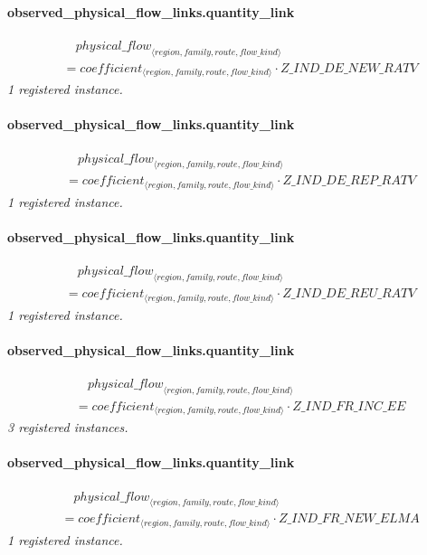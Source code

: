 \documentclass[11pt]{article}
\begin{document}
\paragraph{observed\_physical\_flow\_links.quantity\_link}
\begin{align*}
&\quad {physical\_flow}_{\langle region, family, route, flow\_kind\rangle}\\
&= coefficient_{\langle region, family, route, flow\_kind\rangle} \cdot Z\_IND\_DE\_NEW\_RATV
\end{align*}
\noindent\emph{1 registered instance.}\par
\paragraph{observed\_physical\_flow\_links.quantity\_link}
\begin{align*}
&\quad {physical\_flow}_{\langle region, family, route, flow\_kind\rangle}\\
&= coefficient_{\langle region, family, route, flow\_kind\rangle} \cdot Z\_IND\_DE\_REP\_RATV
\end{align*}
\noindent\emph{1 registered instance.}\par
\paragraph{observed\_physical\_flow\_links.quantity\_link}
\begin{align*}
&\quad {physical\_flow}_{\langle region, family, route, flow\_kind\rangle}\\
&= coefficient_{\langle region, family, route, flow\_kind\rangle} \cdot Z\_IND\_DE\_REU\_RATV
\end{align*}
\noindent\emph{1 registered instance.}\par
\paragraph{observed\_physical\_flow\_links.quantity\_link}
\begin{align*}
&\quad {physical\_flow}_{\langle region, family, route, flow\_kind\rangle}\\
&= coefficient_{\langle region, family, route, flow\_kind\rangle} \cdot Z\_IND\_FR\_INC\_EE
\end{align*}
\noindent\emph{3 registered instances.}\par
\paragraph{observed\_physical\_flow\_links.quantity\_link}
\begin{align*}
&\quad {physical\_flow}_{\langle region, family, route, flow\_kind\rangle}\\
&= coefficient_{\langle region, family, route, flow\_kind\rangle} \cdot Z\_IND\_FR\_NEW\_ELMA
\end{align*}
\noindent\emph{1 registered instance.}\par
\end{document}
